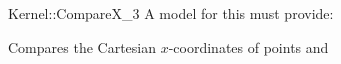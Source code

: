 \begin{ccRefFunctionObjectConcept}{Kernel::CompareX_3}
A model for this must provide:


      {Compares the Cartesian $x$-coordinates of points  and
      }

\ccSeeAlso
{}  \\

\end{ccRefFunctionObjectConcept}
